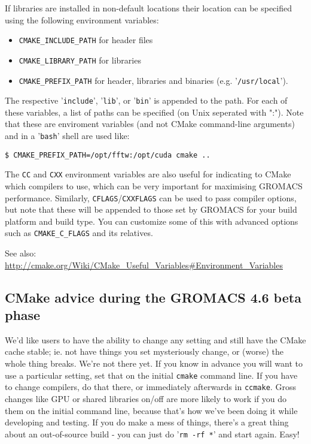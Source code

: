 \documentclass{article}[12pt,a4paper,twoside]
\newcommand{\gromacs}{GROMACS}
\newcommand{\cmake}{CMake}
\begin{document}
If libraries are installed in non-default locations their location can
be specified using the following environment variables:
\begin{itemize}
\item \texttt{CMAKE\_INCLUDE\_PATH} for header files
\item \texttt{CMAKE\_LIBRARY\_PATH} for libraries
\item \texttt{CMAKE\_PREFIX\_PATH} for header, libraries and binaries
  (e.g. '\verb+/usr/local+').
\end{itemize}
The respective '\verb+include+', '\verb+lib+', or '\verb+bin+' is
appended to the path. For each of these variables, a list of paths can
be specified (on Unix seperated with ":"). Note that these are
enviroment variables (and not \cmake{} command-line arguments) and in
a '\verb+bash+' shell are used like:
\begin{verbatim}
$ CMAKE_PREFIX_PATH=/opt/fftw:/opt/cuda cmake ..
\end{verbatim}

The \texttt{CC} and \texttt{CXX} environment variables are also useful
for indicating to \cmake{} which compilers to use, which can be very
important for maximising \gromacs{} performance. Similarly,
\texttt{CFLAGS}/\texttt{CXXFLAGS} can be used to pass compiler
options, but note that these will be appended to those set by
\gromacs{} for your build platform and build type. You can customize
some of this with advanced options such as \texttt{CMAKE\_C\_FLAGS}
and its relatives.

See also: \url{http://cmake.org/Wiki/CMake_Useful_Variables#Environment_Variables}

\subsection{CMake advice during the GROMACS 4.6 beta phase}
We'd like users to have the ability to change any setting and still
have the \cmake{} cache stable; ie. not have things you set
mysteriously change, or (worse) the whole thing breaks. We're not
there yet. If you know in advance you will want to use a particular
setting, set that on the initial \texttt{cmake} command line. If you
have to change compilers, do that there, or immediately afterwards in
\texttt{ccmake}. Gross changes like GPU or shared libraries on/off are
more likely to work if you do them on the initial command line,
because that's how we've been doing it while developing and
testing. If you do make a mess of things, there's a great thing about
an out-of-source build - you can just do '\verb+rm -rf *+' and start
again. Easy!
\end{document}
